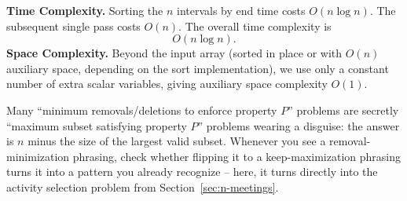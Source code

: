 \begin{complexitybox}
\textbf{Time Complexity.} Sorting the $n$ intervals by end time costs
$O(n \log n)$. The subsequent single pass costs $O(n)$. The overall time
complexity is
\[
  O(n \log n).
\]
\textbf{Space Complexity.} Beyond the input array (sorted in place or with
$O(n)$ auxiliary space, depending on the sort implementation), we use only
a constant number of extra scalar variables, giving auxiliary space
complexity $O(1)$.
\end{complexitybox}

\begin{takeawaybox}
Many ``minimum removals/deletions to enforce property $P$'' problems are
secretly ``maximum subset satisfying property $P$'' problems wearing a
disguise: the answer is $n$ minus the size of the largest valid subset.
Whenever you see a removal-minimization phrasing, check whether flipping it
to a keep-maximization phrasing turns it into a pattern you already
recognize -- here, it turns directly into the activity selection problem
from Section~\ref{sec:n-meetings}.
\end{takeawaybox}

